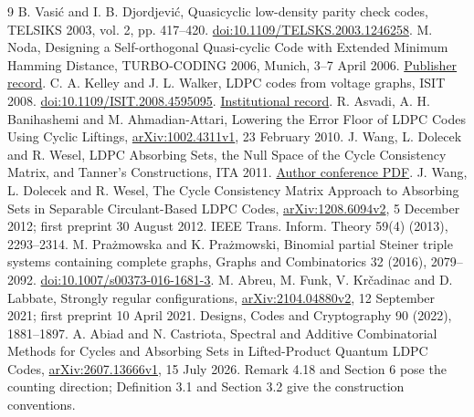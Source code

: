 \documentclass[11pt]{article}
\begin{document}
\begin{thebibliography}{9}\small
{} B. Vasi\'c and I. B. Djordjevi\'c, Quasicyclic low-density parity
check codes, TELSIKS 2003, vol. 2, pp. 417--420.
\href{https://doi.org/10.1109/TELSKS.2003.1246258}{doi:10.1109/TELSKS.2003.1246258}.
 M. Noda, Designing a Self-orthogonal Quasi-cyclic Code with
Extended Minimum Hamming Distance, TURBO-CODING 2006, Munich, 3--7 April 2006.
\href{https://www.vde-verlag.de/proceedings-en/442947110.html}{Publisher record}.
 C. A. Kelley and J. L. Walker, LDPC codes from voltage graphs,
ISIT 2008. \href{https://doi.org/10.1109/ISIT.2008.4595095}{doi:10.1109/ISIT.2008.4595095}.
\href{https://digitalcommons.unl.edu/mathfacpub/171/}{Institutional record}.
 R. Asvadi, A. H. Banihashemi and M. Ahmadian-Attari, Lowering the
Error Floor of LDPC Codes Using Cyclic Liftings,
\href{https://arxiv.org/abs/1002.4311}{arXiv:1002.4311v1}, 23 February 2010.
 J. Wang, L. Dolecek and R. Wesel, LDPC Absorbing Sets, the Null
Space of the Cycle Consistency Matrix, and Tanner's Constructions, ITA 2011.
\href{https://www.seas.ucla.edu/csl/files/publications/JiadongWang_ITA2011.pdf}{Author conference PDF}.
 J. Wang, L. Dolecek and R. Wesel, The Cycle Consistency Matrix
Approach to Absorbing Sets in Separable Circulant-Based LDPC Codes,
\href{https://arxiv.org/abs/1208.6094v2}{arXiv:1208.6094v2}, 5 December 2012;
first preprint 30 August 2012. IEEE Trans. Inform. Theory 59(4) (2013),
2293--2314.
 M. Pra\.{z}mowska and K. Pra\.{z}mowski, Binomial partial Steiner
triple systems containing complete graphs, Graphs and Combinatorics 32 (2016),
2079--2092. \href{https://doi.org/10.1007/s00373-016-1681-3}{doi:10.1007/s00373-016-1681-3}.
 M. Abreu, M. Funk, V. Kr\v{c}adinac and D. Labbate, Strongly
regular configurations, \href{https://arxiv.org/abs/2104.04880v2}{arXiv:2104.04880v2},
12 September 2021; first preprint 10 April 2021. Designs, Codes and Cryptography
90 (2022), 1881--1897.
 A. Abiad and N. Castriota, Spectral and Additive Combinatorial
Methods for Cycles and Absorbing Sets in Lifted-Product Quantum LDPC Codes,
\href{https://arxiv.org/abs/2607.13666v1}{arXiv:2607.13666v1}, 15 July 2026.
Remark 4.18 and Section 6 pose the counting direction; Definition 3.1 and
Section 3.2 give the construction conventions.
\end{thebibliography}
\end{document}
